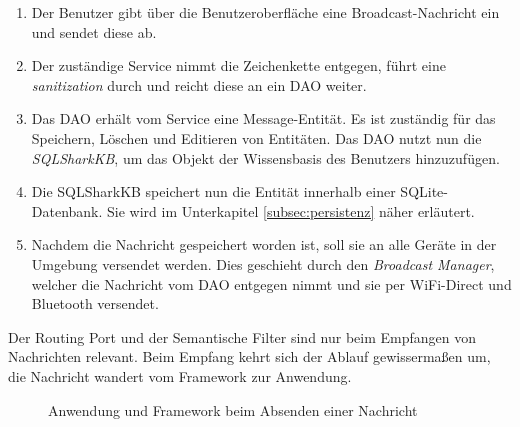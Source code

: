 \begin{enumerate}
	\item Der Benutzer gibt über die Benutzeroberfläche eine Broadcast-Nachricht ein und sendet diese ab. 
	\item Der zuständige Service nimmt die Zeichenkette entgegen, führt eine \textit{sanitization} durch und reicht diese an ein DAO weiter.
	\item Das DAO erhält vom Service eine Message-Entität. Es ist zuständig für das Speichern, Löschen und Editieren von Entitäten. Das DAO nutzt nun die \textit{SQLSharkKB}, um das Objekt der Wissensbasis des Benutzers hinzuzufügen. 
	\item Die SQLSharkKB speichert nun die Entität innerhalb einer SQLite-Datenbank. Sie wird im Unterkapitel \ref{subsec:persistenz} näher erläutert.
	\item Nachdem die Nachricht gespeichert worden ist, soll sie an alle Geräte in der Umgebung versendet werden. Dies geschieht durch den \textit{Broadcast Manager}, welcher die Nachricht vom DAO entgegen nimmt und sie per WiFi-Direct und Bluetooth versendet.
\end{enumerate}\newpage
Der Routing Port und der Semantische Filter sind nur beim Empfangen von Nachrichten relevant. Beim Empfang kehrt sich der Ablauf gewissermaßen um, die Nachricht wandert vom Framework zur Anwendung. 
\begin{figure}[H]
	\centering
	\caption{Anwendung und Framework beim Absenden einer Nachricht}
	\label{fig:empfangenNachrichtStruktur}
\end{figure}
